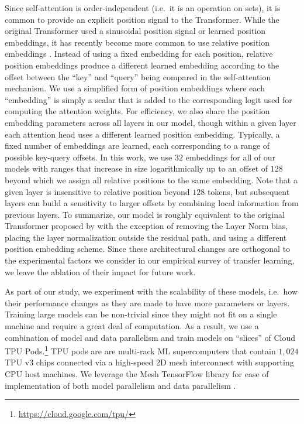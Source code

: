 Since self-attention is order-independent (i.e.\ it is an operation on sets), it is common to provide an explicit position signal to the Transformer. While the original Transformer used a sinusoidal position signal or learned position embeddings, it has recently become more common to use relative position embeddings \citep{shaw2018self,huang2018music}. Instead of using a fixed embedding for each position, relative position embeddings produce a different learned embedding according to the offset between the ``key'' and ``query'' being compared in the self-attention mechanism. We use a simplified form of position embeddings where each ``embedding'' is simply a scalar that is added to the corresponding logit used for computing the attention weights. For efficiency, we also share the position embedding parameters across all layers in our model, though within a given layer each attention head uses a different learned position embedding. Typically, a fixed number of embeddings are learned, each corresponding to a range of possible key-query offsets. In this work, we use $32$ embeddings for all of our models with ranges that increase in size logarithmically up to an offset of $128$ beyond which we assign all relative positions to the same embedding. Note that a given layer is insensitive to relative position beyond $128$ tokens, but subsequent layers can build a sensitivity to larger offsets by combining local information from previous layers. To summarize, our model is roughly equivalent to the original Transformer proposed by \citet{vaswani2017attention} with the exception of removing the Layer Norm bias, placing the layer normalization outside the residual path, and using a different position embedding scheme. Since these architectural changes are orthogonal to the experimental factors we consider in our empirical survey of transfer learning, we leave the ablation of their impact for future work.

As part of our study, we experiment with the scalability of these models, i.e.\ how their performance changes as they are made to have more parameters or layers. Training large models can be non-trivial since they might not fit on a single machine and require a great deal of computation. As a result, we use a combination of model and data parallelism and train models on ``slices'' of Cloud TPU Pods.\footnote{\url{https://cloud.google.com/tpu/}}
TPU pods are are multi-rack ML supercomputers that contain $1{,}024$ TPU v3 chips connected via a high-speed 2D mesh interconnect with supporting CPU host machines. We leverage the Mesh TensorFlow library \citep{shazeer2018mesh} for ease of implementation of both model parallelism and data parallelism \citep{krizhevsky2014one}.


